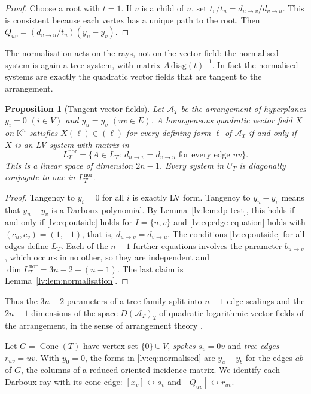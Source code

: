 \documentclass[11pt,a4paper]{article}
\newtheorem{proposition}[theorem]{Proposition}
\theoremstyle{definition}
\theoremstyle{remark}
\newcommand{\Cone}{\operatorname{Cone}}
\newcommand{\K}{\mathbb K}
\begin{document}
\begin{proof}
Choose a root with $t=1$. If $v$ is a child of $u$, set $t_v/t_u=d_{u\to v}/d_{v\to u}$. This is consistent because each vertex has a unique path to the root. Then $Q_{uv}=(d_{v\to u}/t_u)(y_u-y_v)$.
\end{proof}

The normalisation acts on the rays, not on the vector field: the normalised system is again a tree system, with matrix $A\,\mathrm{diag}(t)^{-1}$. In fact the normalised systems are exactly the quadratic vector fields that are tangent to the arrangement.

\begin{proposition}[Tangent vector fields]
\label{lv:prop:tangent}
Let $\mathcal A_T$ be the arrangement of hyperplanes $y_i=0$ $(i\in V)$ and $y_u=y_v$ $(uv\in E)$. A homogeneous quadratic vector field $X$ on $\K^n$ satisfies $X(\ell)\in(\ell)$ for every defining form $\ell$ of $\mathcal A_T$ if and only if $X$ is an LV system with matrix in
\[
 L_T^{\mathrm{nor}}=\{A\in L_T:\ d_{u\to v}=d_{v\to u}\text{ for every edge }uv\}.
\]
This is a linear space of dimension $2n-1$. Every system in $U_T$ is diagonally conjugate to one in $L_T^{\mathrm{nor}}$.
\end{proposition}

\begin{proof}
Tangency to $y_i=0$ for all $i$ is exactly LV form. Tangency to $y_u-y_v$ means that $y_u-y_v$ is a Darboux polynomial. By Lemma~\ref{lv:lem:dp-test}, this holds if and only if \eqref{lv:eq:outside} holds for $I=\{u,v\}$ and \eqref{lv:eq:edge-equation} holds with $(c_u,c_v)=(1,-1)$, that is, $d_{u\to v}=d_{v\to u}$. The conditions \eqref{lv:eq:outside} for all edges define $L_T$. Each of the $n-1$ further equations involves the parameter $b_{u\to v}$, which occurs in no other, so they are independent and $\dim L_T^{\mathrm{nor}}=3n-2-(n-1)$. The last claim is Lemma~\ref{lv:lem:normalisation}.
\end{proof}

Thus the $3n-2$ parameters of a tree family split into $n-1$ edge scalings and the $2n-1$ dimensions of the space $D(\mathcal A_T)_2$ of quadratic logarithmic vector fields of the arrangement, in the sense of arrangement theory \cite{lv:Toh2015,lv:AM2026}.

Let $G=\Cone(T)$ have vertex set $\{0\}\cup V$, \emph{spokes} $s_v=0v$ and \emph{tree edges} $r_{uv}=uv$. With $y_0=0$, the forms in \eqref{lv:eq:normalised} are $y_a-y_b$ for the edges $ab$ of $G$, the columns of a reduced oriented incidence matrix. We identify each Darboux ray with its cone edge: $[x_v]\leftrightarrow s_v$ and $[Q_{uv}]\leftrightarrow r_{uv}$.
\end{document}
